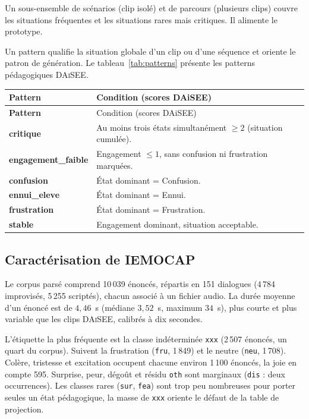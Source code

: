 Un sous-ensemble de scénarios (clip isolé) et de parcours (plusieurs
clips) couvre les situations fréquentes et les situations rares mais
critiques. Il alimente le prototype.

Un pattern qualifie la situation globale d'un clip ou d'une séquence
et oriente le patron de génération.
Le tableau~\ref{tab:patterns} présente les patterns pédagogiques
\textsc{DAiSEE}.

{\small
\renewcommand{\arraystretch}{1.18}
\setlength{\tabcolsep}{4pt}
\begin{xltabular}{\textwidth}{|>{\bfseries}l|X|}
\hline
{}
Pattern & Condition (scores DAiSEE) \\
\hline
\endfirsthead
\hline
{}
Pattern & Condition (scores DAiSEE) \\
\hline
\endhead
\endfoot
\endlastfoot
critique          & Au moins trois états simultanément $\geq 2$ (situation cumulée). \\
\hline
engagement\_faible & Engagement $\leq 1$, sans confusion ni frustration marquées. \\
\hline
confusion         & État dominant = Confusion. \\
\hline
ennui\_eleve       & État dominant = Ennui. \\
\hline
frustration       & État dominant = Frustration. \\
\hline
stable            & Engagement dominant, situation acceptable. \\
\hline
\end{xltabular}
\label{tab:patterns}
}

\subsection{Caractérisation de \textsc{IEMOCAP}}
\label{subsec:iemocap-dist}
\label{subsec:iemocap-eda}

Le corpus parsé comprend 10\,039 énoncés, répartis en 151
dialogues (4\,784 improvisés, 5\,255 scriptés), chacun associé à un
fichier audio. La durée moyenne d'un énoncé est de $4{,}46$~s
(médiane $3{,}52$~s, maximum $34$~s), plus courte et plus variable
que les clips \textsc{DAiSEE}, calibrés à dix secondes.

L'étiquette la plus fréquente est la classe indéterminée
\texttt{xxx} (2\,507 énoncés, un quart du corpus). Suivent la
frustration (\texttt{fru}, 1\,849) et le neutre (\texttt{neu},
1\,708). Colère, tristesse et excitation occupent chacune environ
1\,100 énoncés, la joie en compte 595. Surprise, peur, dégoût et
résidu \texttt{oth} sont marginaux (\texttt{dis} : deux
occurrences). Les classes rares (\texttt{sur}, \texttt{fea}) sont
trop peu nombreuses pour porter seules un état pédagogique, la
masse de \texttt{xxx} oriente le défaut de la table de projection.


